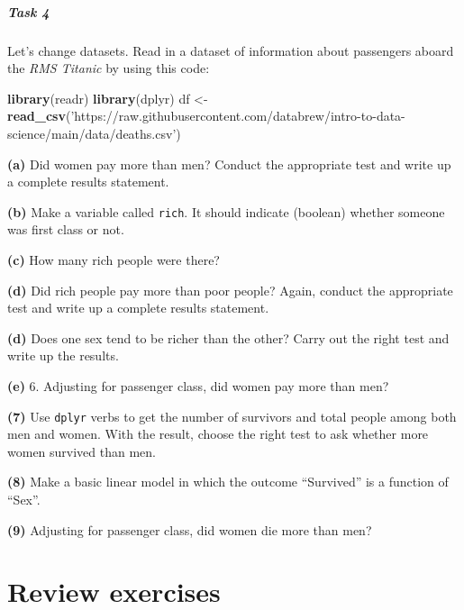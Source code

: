 \documentclass[
]{book}
\newenvironment{Shaded}{\begin{snugshade}}{\end{snugshade}}
\newcommand{\KeywordTok}[1]{\textcolor[rgb]{0.13,0.29,0.53}{\textbf{#1}}}
\newcommand{\NormalTok}[1]{#1}
\newcommand{\StringTok}[1]{\textcolor[rgb]{0.31,0.60,0.02}{#1}}
\begin{document}
\hypertarget{task-4}{%
\subsubsection*{Task 4}\label{task-4}}

Let's change datasets. Read in a dataset of information about passengers aboard the \emph{RMS Titanic} by using this code:

\begin{Shaded}
\begin{Highlighting}[]
\KeywordTok{library}\NormalTok{(readr)}
\KeywordTok{library}\NormalTok{(dplyr)}
\NormalTok{df <-}\StringTok{ }\KeywordTok{read_csv}\NormalTok{(}\StringTok{'https://raw.githubusercontent.com/databrew/intro-to-data-science/main/data/deaths.csv'}\NormalTok{)}
\end{Highlighting}
\end{Shaded}

\textbf{(a)} Did women pay more than men? Conduct the appropriate test and write up a complete results statement.

\textbf{(b)} Make a variable called \texttt{rich}. It should indicate (boolean) whether someone was first class or not.

\textbf{(c)} How many rich people were there?

\textbf{(d)} Did rich people pay more than poor people? Again, conduct the appropriate test and write up a complete results statement.

\textbf{(d)} Does one sex tend to be richer than the other? Carry out the right test and write up the results.

\textbf{(e)} 6. Adjusting for passenger class, did women pay more than men?

\textbf{(7)} Use \texttt{dplyr} verbs to get the number of survivors and total people among both men and women. With the result, choose the right test to ask whether more women survived than men.

\textbf{(8)} Make a basic linear model in which the outcome ``Survived'' is a function of ``Sex''.

\textbf{(9)} Adjusting for passenger class, did women die more than men?

\hypertarget{part-review-exercises}{%
\part{Review exercises}\label{part-review-exercises}}
\end{document}

